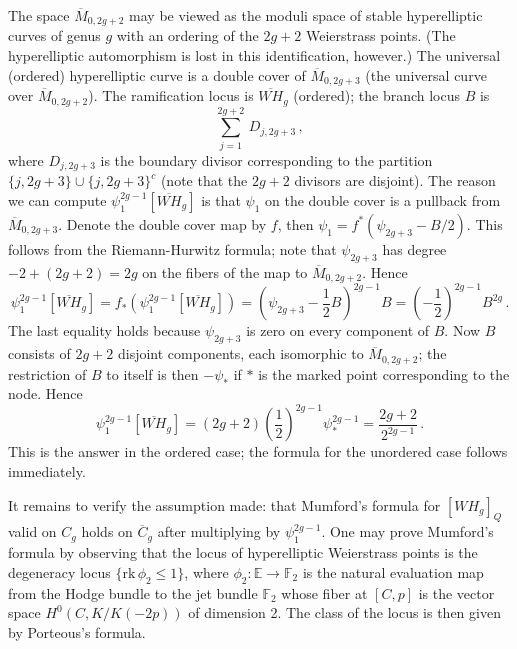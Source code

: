 \documentclass[11 pt]{amsart}
\newcommand{\hodge}{\mathbb{E}}
\newcommand{\rk}{\text{rk}}
\begin{document}
The space ${\overline{M}}_{0,2g+2}$ may be viewed as the moduli space
of stable hyperelliptic curves of genus $g$ with an ordering of the
$2g+2$ Weierstrass points. (The hyperelliptic automorphism is lost
in this identification, however.) The universal (ordered) hyperelliptic
curve is a double cover of ${\overline{M}}_{0,2g+3}$ (the universal curve
over ${\overline{M}}_{0,2g+2}$). The ramification locus is
${\overline{WH}}_g$ (ordered); the branch locus $B$ is 
$$\sum_{j=1}^{2g+2}\,D_{j,2g+3}\,,$$
where $D_{j,2g+3}$ is the boundary divisor corresponding to the
partition $\{j,2g+3\}\cup\{j,2g+3\}^c$ (note that the $2g+2$ divisors
are disjoint).
The reason we can compute $\psi_1^{2g-1}[{\overline{WH}}_g]$
is that $\psi_1$ on the double cover is a pullback from 
${\overline{M}}_{0,2g+3}$. Denote the double cover map by $f$, then
$\psi_1=f^*(\psi_{2g+3}-B/2)$. This follows from the Riemann-Hurwitz
formula; note that $\psi_{2g+3}$ has degree $-2+(2g+2)=2g$ on the fibers
of the map to ${\overline{M}}_{0,2g+2}$. Hence
$$
\psi_1^{2g-1}[{\overline{WH}}_g]=f_*(\psi_1^{2g-1}[{\overline{WH}}_g])
=(\psi_{2g+3}-\frac12B)^{2g-1}B=(-\frac12)^{2g-1}B^{2g}\,.
$$
The last equality holds because $\psi_{2g+3}$ is zero on every component
of $B$. Now $B$ consists of $2g+2$ disjoint components, each
isomorphic to ${\overline{M}}_{0,2g+2}$; the restriction of $B$ to itself
is then $-\psi_*$ if $*$ is the marked point corresponding to the node.
Hence
$$
\psi_1^{2g-1}[{\overline{WH}}_g]=(2g+2)(\frac12)^{2g-1}\psi_*^{2g-1}
=\frac{2g+2}{2^{2g-1}}\,.
$$
This is the answer in the ordered case; the formula for the unordered
case follows immediately.

It remains to verify the assumption made: that Mumford's formula
for $[WH_g]_Q$ valid on $C_g$ holds on ${\overline{C}}_g$ after
multiplying by $\psi_1^{2g-1}$.
One may prove Mumford's formula by observing that the locus of
hyperelliptic Weierstrass points is the degeneracy locus
$\{\rk\,\phi_2\le1\}$,
where $\phi_2:\hodge\to{\mathbb{F}}_2$ is the natural evaluation map
from the Hodge bundle to the jet bundle
$\mathbb{F}_2$ whose fiber
at $[C,p]$ is the vector space $H^0(C,K/K(-2p))$ of dimension 2.
The class of the locus is then given by Porteous's formula. 
\end{document}
